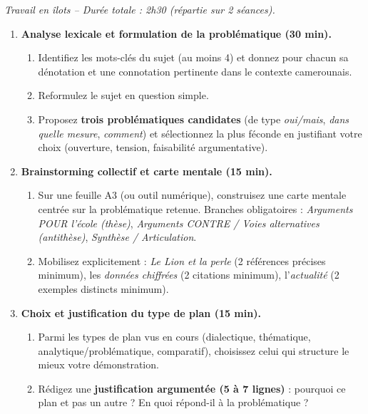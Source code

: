\documentclass[11pt]{article}
\newcommand{\cle}[1]{{\popxbold\color{popdark}#1}}
\newcounter{popsec}
\newcounter{popsub}
\newcommand{\courssub}[1]{%
  \stepcounter{popsub}%
  \par\vspace{9pt}\noindent{\popxbold\fontsize{11.5}{13}\selectfont\color{popink}{\color{poporange}\thepopsec.\thepopsub}\hspace{6pt}#1}\par\nopagebreak\vspace{4pt}
}
\begin{document}
\courssub{Consignes}
\label{consignes:integration}
\emph{Travail en îlots -- Durée totale : 2h30 (répartie sur 2 séances).}

\begin{enumerate}
    \item \textbf{Analyse lexicale et formulation de la problématique (30 min).}
    \begin{enumerate}
        \item Identifiez les \cle{mots-clés} du sujet (au moins 4) et donnez pour chacun sa \cle{dénotation} et une \cle{connotation} pertinente dans le contexte camerounais.
        \item Reformulez le sujet en question simple.
        \item Proposez \textbf{trois problématiques candidates} (de type \emph{oui/mais}, \emph{dans quelle mesure}, \emph{comment}) et sélectionnez la plus féconde en justifiant votre choix (ouverture, tension, faisabilité argumentative).
    \end{enumerate}

    \item \textbf{Brainstorming collectif et carte mentale (15 min).}
    \begin{enumerate}
        \item Sur une feuille A3 (ou outil numérique), construisez une \cle{carte mentale} centrée sur la problématique retenue. Branches obligatoires : \emph{Arguments POUR l'école (thèse)}, \emph{Arguments CONTRE / Voies alternatives (antithèse)}, \emph{Synthèse / Articulation}.
        \item Mobilisez explicitement : \emph{Le Lion et la perle} (2 références précises minimum), les \emph{données chiffrées} (2 citations minimum), l'\emph{actualité} (2 exemples distincts minimum).
    \end{enumerate}

    \item \textbf{Choix et justification du type de plan (15 min).}
    \begin{enumerate}
        \item Parmi les types de plan vus en cours (dialectique, thématique, analytique/problématique, comparatif), choisissez celui qui structure le mieux votre démonstration.
        \item Rédigez une \textbf{justification argumentée (5 à 7 lignes)} : pourquoi ce plan et pas un autre ? En quoi répond-il à la problématique ?
    \end{enumerate}


\end{enumerate}
\end{document}
